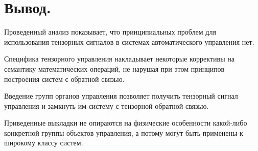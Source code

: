 \documentclass[a4paper]{article}
\begin{document}
\section{Вывод.}
Проведенный анализ показывает, что принципиальных проблем для использования тензорных сигналов в системах автоматического управления нет. 

Специфика тензорного управления накладывает некоторые коррективы на семантику математических операций, не нарушая при этом принципов построения систем с обратной связью.

Введение групп органов управления позволяет получить тензорный сигнал управления и замкнуть им систему с тензорной обратной связью. 

Приведенные выкладки не опираются на физические особенности какой-либо конкретной группы объектов управления, а потому могут быть применены к широкому классу систем.
\end{document}

